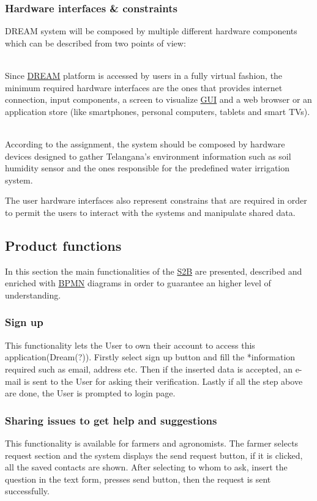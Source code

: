 \subsubsection{Hardware interfaces \& constraints}
DREAM system will be composed by multiple different hardware components which can be described from two points of view:
\begin{description}[font=~\normalfont\scshape]
    \item[\textbf{\textcolor{myblue}{user perspective}}] \hfill \\Since \hyperref[tab:acronymsTable]{DREAM} platform is accessed by users in a fully virtual fashion, the minimum required hardware interfaces are the ones that provides internet connection, input components, a screen to visualize \hyperref[tab:acronymsTable]{GUI} and a web browser or an application store (like smartphones, personal computers, tablets and smart TVs).
    \item[\textbf{\textcolor{myblue}{system perspective}}] \hfill \\According to the assignment, the system should be composed by hardware devices designed to gather Telangana's environment information such as soil humidity sensor and the ones responsible for the predefined water irrigation system.
\end{description}
The user hardware interfaces also represent constrains that are required in order to permit the users to interact with the systems and manipulate shared data.

\subsection{Product functions}
\label{sect:product_functions}
In this section the main functionalities of the \hyperref[tab:acronymsTable]{S2B} are presented, described and enriched with \hyperref[tab:acronymsTable]{BPMN} diagrams in order to guarantee an higher level of understanding.
\subsubsection{Sign up}
This functionality lets the User to own their account to access this application(Dream(?)).
Firstly select sign up button and fill the *information required such as email, address etc.
Then if the inserted data is accepted, an e-mail is sent to the User for asking their
verification.
Lastly if all the step above are done, the User is prompted to login page.
\subsubsection{Sharing issues to get help and suggestions}
This functionality is available for farmers and agronomists. The farmer selects request 
section and the system displays the send request button, if it is clicked, all the saved 
contacts are shown. After selecting to whom to ask, insert the question in the text form,
presses send button, then the request is sent successfully.
